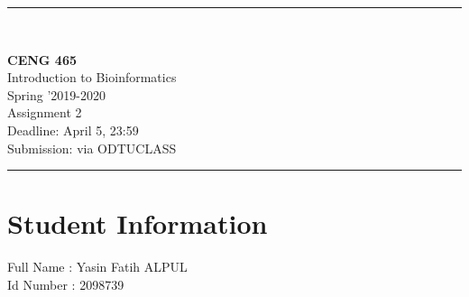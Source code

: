 \documentclass[12pt]{article}
\newcommand{\HRule}{\rule{\linewidth}{1mm}}
\begin{document}
\noindent
\HRule \\[3mm]
\begin{flushright}

                                         \LARGE \textbf{CENG 465}  \\[4mm]
                                         \Large Introduction to Bioinformatics \\[4mm]
                                        \normalsize      Spring '2019-2020 \\
                                           \Large   Assignment 2 \\
                    \normalsize Deadline: April 5, 23:59 \\
                    \normalsize Submission: via ODTUCLASS
\end{flushright}
\HRule

\section*{Student Information }
Full Name : Yasin Fatih ALPUL \\
Id Number :  2098739 \\
\end{document}
